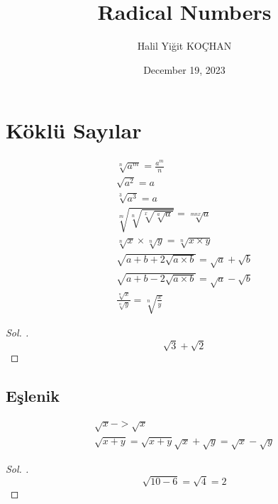 \documentclass{article}
\title{Radical Numbers}
\author{Halil Yiğit KOÇHAN}
\date{December 19, 2023}
\theoremstyle{mytheoremstyle}
\theoremstyle{mytheoremstyle}
\theoremstyle{myproblemstyle}
\begin{document}
    \maketitle

\section{Köklü Sayılar}

\begin{gather*}
  \sqrt[n]{a^m} = \frac{a^m}{n}\\
  \sqrt{a^2} = a\\
  \sqrt[3]{a^3} = a\\
  \sqrt[m]{\sqrt[n]{\sqrt[x]{\sqrt[a]{a}}}} = \sqrt[mnx]{a}\\
  \sqrt[n]{x} \times \sqrt[n]{y} = \sqrt[n]{x \times y}\\
  \sqrt{a + b + 2\sqrt{a \times b}} = \sqrt{a} + \sqrt{b}\\
  \sqrt{a + b - 2\sqrt{a \times b}} = \sqrt{a} - \sqrt{b}\\
  \frac{\sqrt[n]{x}}{\sqrt[n]{y}} = \sqrt[n]{\frac{x}{y}}
\end{gather*}

\begin{problem}[$ \sqrt{5 + 2\sqrt{6}} = ? $]
\end{problem}

\begin{proof}[\textit{ Sol. }]
  $$ \sqrt{3} + \sqrt{2} $$
\end{proof}

\subsection{Eşlenik}

\begin{gather*}
  \sqrt{x} -> \sqrt{x}\\
  \sqrt{x + y} = \sqrt{x + y}
  \sqrt{x} + \sqrt{y} = \sqrt{x} - \sqrt{y}
\end{gather*}

\begin{problem}[$ \sqrt{10 - \sqrt{31 + \sqrt{21} + \sqrt{19} - \sqrt{9}}} = ? $]
\end{problem}

\begin{proof}[\textit{ Sol. }]
  $$ \sqrt{10 - 6} = \sqrt{4} = 2 $$
\end{proof}

\begin{problem}[$ \sqrt{18} + \sqrt{50} + \sqrt{72} + \sqrt{8} = ? $]
\end{problem}
\end{document}
